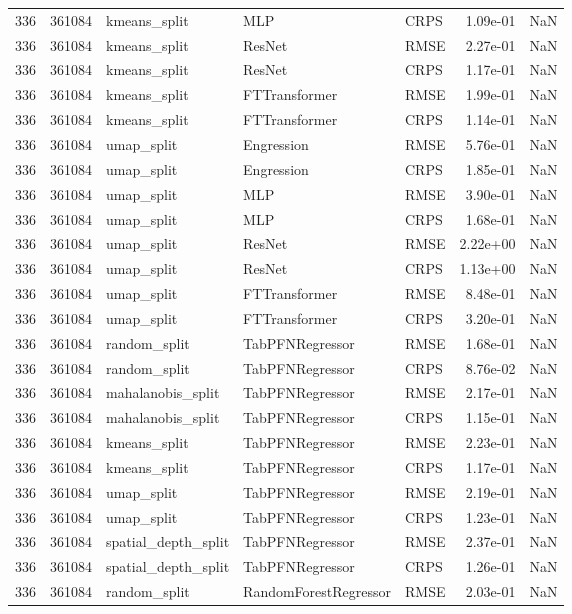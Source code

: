 \begin{tabular}{rrlllrr}
336 & 361084 & kmeans\_split & MLP & CRPS & 1.09e-01 & NaN \\
336 & 361084 & kmeans\_split & ResNet & RMSE & 2.27e-01 & NaN \\
336 & 361084 & kmeans\_split & ResNet & CRPS & 1.17e-01 & NaN \\
336 & 361084 & kmeans\_split & FTTransformer & RMSE & 1.99e-01 & NaN \\
336 & 361084 & kmeans\_split & FTTransformer & CRPS & 1.14e-01 & NaN \\
336 & 361084 & umap\_split & Engression & RMSE & 5.76e-01 & NaN \\
336 & 361084 & umap\_split & Engression & CRPS & 1.85e-01 & NaN \\
336 & 361084 & umap\_split & MLP & RMSE & 3.90e-01 & NaN \\
336 & 361084 & umap\_split & MLP & CRPS & 1.68e-01 & NaN \\
336 & 361084 & umap\_split & ResNet & RMSE & 2.22e+00 & NaN \\
336 & 361084 & umap\_split & ResNet & CRPS & 1.13e+00 & NaN \\
336 & 361084 & umap\_split & FTTransformer & RMSE & 8.48e-01 & NaN \\
336 & 361084 & umap\_split & FTTransformer & CRPS & 3.20e-01 & NaN \\
336 & 361084 & random\_split & TabPFNRegressor & RMSE & 1.68e-01 & NaN \\
336 & 361084 & random\_split & TabPFNRegressor & CRPS & 8.76e-02 & NaN \\
336 & 361084 & mahalanobis\_split & TabPFNRegressor & RMSE & 2.17e-01 & NaN \\
336 & 361084 & mahalanobis\_split & TabPFNRegressor & CRPS & 1.15e-01 & NaN \\
336 & 361084 & kmeans\_split & TabPFNRegressor & RMSE & 2.23e-01 & NaN \\
336 & 361084 & kmeans\_split & TabPFNRegressor & CRPS & 1.17e-01 & NaN \\
336 & 361084 & umap\_split & TabPFNRegressor & RMSE & 2.19e-01 & NaN \\
336 & 361084 & umap\_split & TabPFNRegressor & CRPS & 1.23e-01 & NaN \\
336 & 361084 & spatial\_depth\_split & TabPFNRegressor & RMSE & 2.37e-01 & NaN \\
336 & 361084 & spatial\_depth\_split & TabPFNRegressor & CRPS & 1.26e-01 & NaN \\
336 & 361084 & random\_split & RandomForestRegressor & RMSE & 2.03e-01 & NaN \\

\end{tabular}
